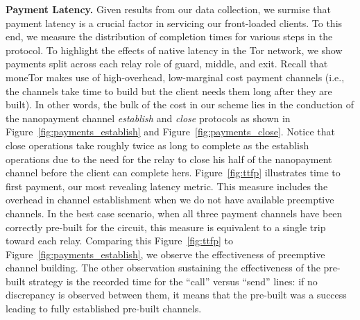 

\medskip
\noindent
\textbf{Payment Latency.}
Given results from our data collection, we surmise that payment latency is a
crucial factor in servicing our front-loaded clients. To this end, we measure
the distribution of completion times for various steps in the protocol. To
highlight the effects of native latency in the Tor network, we show payments
split across each relay role of guard, middle, and exit. Recall that moneTor
makes use of high-overhead, low-marginal cost payment channels (i.e., the
channels take time to build but the client needs them long after they are
built). In other words, the bulk of the cost in our scheme lies in the
conduction of the nanopayment channel \emph{establish} and \emph{close}
protocols as shown in Figure~\ref{fig:payments_establish} and
Figure~\ref{fig:payments_close}. Notice that close operations take roughly twice
as long to complete as the establish operations due to the need for the relay to
close his half of the nanopayment channel before the client can complete hers.
Figure~\ref{fig:ttfp} illustrates time to first payment, our most revealing
latency metric. This measure includes the overhead in channel establishment when
we do not have available preemptive channels. In the best case scenario, when
all three payment channels have been correctly pre-built for the circuit, this
measure is equivalent to a single trip toward each relay. Comparing this
Figure~\ref{fig:ttfp} to Figure~\ref{fig:payments_establish}, we observe the
effectiveness of preemptive channel building. The other observation sustaining
the effectiveness of the pre-built strategy is the recorded time for the
``call'' versus ``send'' lines: if no discrepancy is observed between them, it means that the pre-built was a success leading to fully established pre-built channels.

